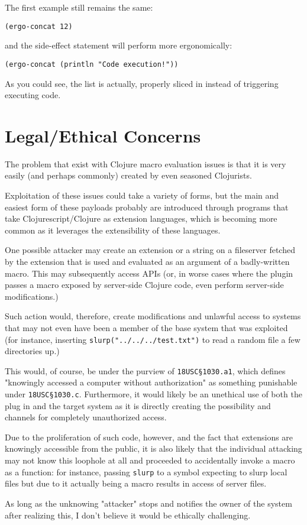 \documentclass[letterpaper]{article}
\begin{document}
The first example still remains the same:

\begin{verbatim}
(ergo-concat 12)
\end{verbatim}

and the side-effect statement will perform more ergonomically: 

\begin{verbatim}
(ergo-concat (println "Code execution!"))
\end{verbatim}

As you could see, the list is actually, properly sliced in instead of triggering executing code.

\section{Legal/Ethical Concerns}
\label{sec:org3d6dafa}
The problem that exist with Clojure macro evaluation issues is that it is very easily (and perhaps commonly) created by even seasoned Clojurists.

Exploitation of these issues could take a variety of forms, but the main and easiest form of these payloads probably are introduced through programs that take Clojurescript/Clojure as extension languages, which is becoming more common as it leverages the extensibility of these languages.

One possible attacker may create an extension or a string on a fileserver fetched by the extension that is used and evaluated as an argument of a badly-written macro. This may subsequently access APIs (or, in worse cases where the plugin passes a macro exposed by server-side Clojure code, even perform server-side modifications.)

Such action would, therefore, create modifications and unlawful access to systems that may not even have been a member of the base system that was exploited (for instance, inserting \texttt{slurp("../../../test.txt")} to read a random file a few directories up.)

This would, of course, be under the purview of \texttt{18USC§1030.a1}, which defines "knowingly accessed a computer without authorization" as something punishable under \texttt{18USC§1030.c}. Furthermore, it would likely be an unethical use of both the plug in and the target system as it is directly creating the possibility and channels for completely unauthorized access.

Due to the proliferation of such code, however, and the fact that extensions are knowingly accessible from the public, it is also likely that the individual attacking may not know this loophole at all and proceeded to accidentally invoke a macro as a function: for instance, passing \texttt{slurp} to a symbol expecting to slurp local files but due to it actually being a macro results in access of server files.

As long as the unknowing "attacker" stops and notifies the owner of the system after realizing this, I don't believe it would be ethically challenging.
\end{document}
